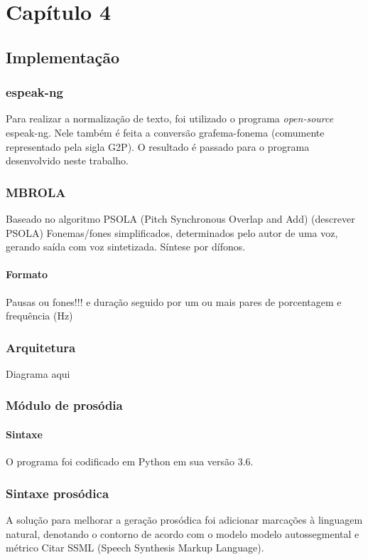 
\chapter{Capítulo 4}

\section{Implementação}

\subsection{espeak-ng}
Para realizar a normalização de texto, foi utilizado o programa
\emph{open-source} espeak-ng. Nele também é feita a conversão grafema-fonema
(comumente representado pela sigla G2P). O resultado é passado para o programa
desenvolvido neste trabalho.

\subsection{MBROLA}
Baseado no algoritmo PSOLA (Pitch Synchronous Overlap and Add) (descrever PSOLA)
Fonemas/fones simplificados, determinados pelo autor de uma voz, gerando saída
com voz sintetizada. Síntese por dífonos.

\subsubsection{Formato}
Pausas ou fones!!! e duração seguido por um ou mais pares de porcentagem e frequência (Hz)

\subsection{Arquitetura}
Diagrama aqui

\subsection{Módulo de prosódia}
\subsubsection{Sintaxe}
O programa foi codificado em Python em sua versão 3.6.

\subsection{Sintaxe prosódica}
A solução para melhorar a geração prosódica foi adicionar marcações à linguagem
natural, denotando o contorno de acordo com o modelo modelo autossegmental e métrico
Citar SSML (Speech Synthesis Markup Language).

